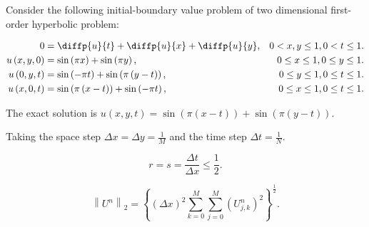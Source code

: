 \begin{frame}
    \begin{example}
        Consider the following initial-boundary value problem of two
        dimensional first-order hyperbolic problem:

        \begin{equation*}
            \begin{aligned}
                0                                     & =
                \diffp{u}{t}+
                \diffp{u}{x}+
                \diffp{u}{y},                         &
                0<x,y\leq 1,
                0<t\leq 1.                                \\
                u\left(x,y,0\right)                   & =
                \sin\left(\pi x\right)+
                \sin\left(\pi y\right),               &
                0\leq x\leq 1,
                0\leq y\leq 1.                            \\
                u\left(0,y,t\right)                   & =
                \sin\left(-\pi t\right)+
                \sin\left(\pi\left(y-t\right)\right), &
                0\leq y\leq 1,
                0\leq t\leq 1.                            \\
                u\left(x,0,t\right)                   & =
                \sin\left(\pi\left(x-t\right)\right)+
                \sin\left(-\pi t\right),              &
                0\leq x\leq 1,
                0\leq t\leq 1.
            \end{aligned}
        \end{equation*}

        The exact solution is
        \begin{math}
            u\left(x,y,t\right)=
            \sin\left(\pi\left(x-t\right)\right)+
            \sin\left(\pi\left(y-t\right)\right)
        \end{math}.
    \end{example}

\end{frame}

\begin{frame}
    Taking the space step
    \begin{math}
        \Delta x=
        \Delta y=
        \frac{1}{M}
    \end{math}
    and the time step
    \begin{math}
        \Delta t=
        \frac{1}{N}
    \end{math}.

    \begin{equation*}
        \boxed{
            r=s=
            \frac{\Delta t}{\Delta x}\leq
            \frac{1}{2}.
        }
    \end{equation*}

    \begin{equation*}
        {\left\|U^{n}\right\|}_{2}=
        \left\{
        {\left(\Delta x\right)}^{2}
        \sum_{k=0}^{M}
        \sum_{j=0}^{M}
        \left(U^{n}_{j,k}\right)^{2}
        \right\}^{\frac{1}{2}}.
    \end{equation*}
\end{frame}